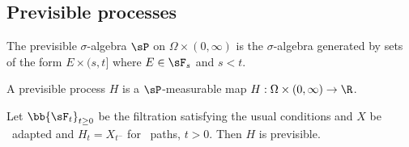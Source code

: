 
\subsection{Previsible processes}

\begin{definition}\label{def:previsible_sigma_algebra}
The previsible $\sigma$-algebra $\sP$ on $\Omega \times (0,\infty)$ is the $\sigma$-algebra generated by sets of the form $E \times(s, t]$ where $E \in \sF_s$ and $s < t$.
\end{definition}

\begin{definition}\label{def:previsible_process_continuous}
A previsible process $H$ is a $\sP$-measurable map $H: \Omega \times (0,\infty) \to \R$.
\end{definition}

\begin{proposition}\label{pro:previsible}
Let $\bb{\sF_t}_{t\geq 0}$ be the filtration satisfying the usual conditions and $X$ be \cadlag\ adapted and $H_t = X_{t^-}$ for \cadlag\ paths, $t > 0$. Then $H$ is previsible.
\end{proposition}

